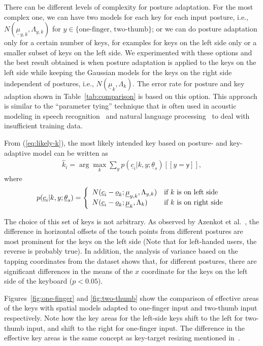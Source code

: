 \documentclass{sigchi}
\begin{document}
There can be different levels of complexity for posture adaptation. For the most complex one, we can have
two models for each key for each input posture, i.e., $N(\underline \mu_{y,k}, \Lambda_{y,k})$ for $y \in
\{\text{one-finger, two-thumb}\}$; or we can do posture adaptation only for a certain
number of keys, for examples for keys on the left side only or a smaller subset of keys on the left side. We experimented with these options and the best result obtained is when posture adaptation is applied to the keys on
the left side while keeping the Gaussian models for the keys on the right side independent of postures, i.e., $N(\underline\mu_k, \Lambda_k)$.
The error rate for posture and key adaption shown in Table~\ref{tab:comparison} is based on
this option. This approach is similar to the ``parameter tying'' technique that is often used in acoustic modeling in speech recognition~\cite{Bellegarda:1989} and natural language processing~\cite{Lin:1995} to deal with insufficient training data.

From (\ref{eq:likely-k}), the most likely intended key based on posture- and key-adaptive model can be written as
\begin{align}          
\hat k_i = \arg\max_k \sum_{y} p(\underline c_i | k, y; \underline\theta_s)[[y = \textsf{y}]],
\end{align}
where
\begin{align}
p(\underline c_i | k, y; \underline\theta_s) = \left\{
 \begin{array}{l l}
 N(\underline c_i - \underline o_k; \underline \mu_{y, k}, \Lambda_{y,k}) & \text{if $k$ is on left side} \\
 N(\underline c_i - \underline o_k; \underline \mu_{k}, \Lambda_{k}) & \text{if $k$ is on right side} \\
\end{array} \right.
\end{align}

The choice of this set of keys is not arbitrary. As observed by Azenkot et al.~\cite{Azenkot:2012}, the difference in horizontal
offsets of the touch points from different postures are most prominent for the keys on the
left side (Note that for left-handed users, the reverse is probably true).
In addition, the analysis of variance based on the tapping coordinates from the
dataset shows that, for different postures, there are significant differences in the means of
the $x$ coordinate for the keys on the left side of the keyboard ($p < 0.05$).

Figures~\ref{fig:one-finger} and \ref{fig:two-thumb} show the comparison of effective areas of the keys
with spatial models adapted to one-finger input and two-thumb input respectively. Note how the key areas for the left-side keys shift to the left
for two-thumb input, and shift to the right for one-finger input. The difference in
the effective key areas is the same concept as key-target resizing mentioned in~\cite{Gunawardana:2010, Rudchenko:2011}.
\end{document}
